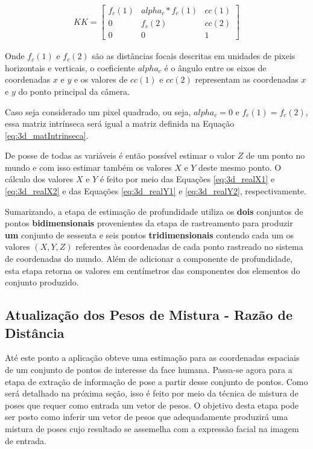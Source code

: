 \begin{align}
KK =
\left[\begin{array}{ccc}
f_c(1) & alpha_c*f_c(1) & cc(1)\\
0 & f_c(2) & cc(2)\\
0 & 0 & 1
\end{array}\right]
\label{eq:calib_matIntrinseca}
\end{align}

Onde $f_c(1)$ e $f_c(2)$ são as distâncias focais descritas em unidades de
pixeis horizontais e verticais, o coeficiente $alpha_c$ é o ângulo entre os
eixos de coordenadas $x$ e $y$ e os valores de $cc(1)$ e $cc(2)$ representam as
coordenadas $x$ e $y$ do ponto principal da câmera.

Caso seja considerado um pixel quadrado, ou seja, $alpha_c = 0$ e $f_c(1) =
f_c(2)$, essa matriz intrínseca será igual a matriz definida na Equação
\ref{eq:3d_matIntrinseca}.

De posse de todas as variáveis é então possível estimar o valor $Z$ de um ponto
no mundo e com isso estimar também os valores $X$ e $Y$ deste mesmo ponto. O
cálculo dos valores $X$ e $Y$ é feito por meio das Equações \ref{eq:3d_realX1} e
\ref{eq:3d_realX2} e das Equações \ref{eq:3d_realY1} e \ref{eq:3d_realY2},
respectivamente.    

Sumarizando, a etapa de estimação de profundidade utiliza os \textbf{dois}
conjuntos de pontos \textbf{bidimensionais} provenientes da etapa de
rastreamento para produzir \textbf{um} conjunto de sessenta e seis pontos
\textbf{tridimensionais} contendo cada um os valores $(X,Y,Z)$ referentes às
coordenadas de cada ponto rastreado no sistema de coordenadas do mundo. Além de
adicionar a componente de profundidade, esta etapa retorna os valores em
centímetros das componentes dos elementos do conjunto produzido.

\subsection{Atualização dos Pesos de Mistura - Razão de Distância}

Até este ponto a aplicação obteve uma estimação para as coordenadas espaciais de
um conjunto de pontos de interesse da face humana. Passa-se agora para a etapa
de extração de informação de pose a partir desse conjunto de pontos. Como será
detalhado na próxima seção, isso é feito por meio da técnica de mistura de poses
que requer como entrada um vetor de pesos. O objetivo desta etapa pode ser posto
como inferir um vetor de pesos que adequadamente produzirá uma mistura de poses
cujo resultado se assemelha com a expressão facial na imagem de entrada.

